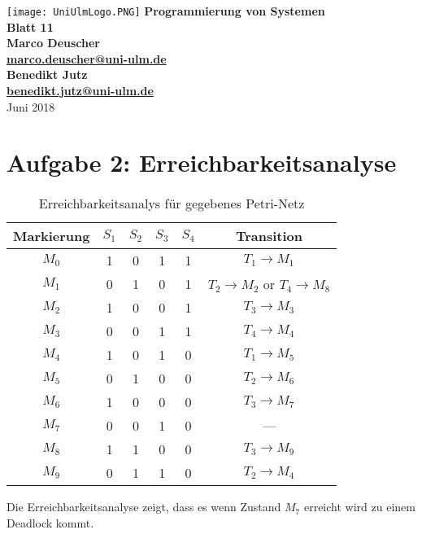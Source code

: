 \documentclass{article}
\begin{document}
\begin{titlepage}
    \centering
    \vfill
    \texttt{[image: UniUlmLogo.PNG]} %
    \vfill
    \vfill
    {\bfseries\Large
        Programmierung von Systemen\\
        Blatt 11\\
        \vskip2cm
        Marco Deuscher\\ \href{mailto:marco.deuscher@uni-ulm.de}{marco.deuscher@uni-ulm.de}\\
        Benedikt Jutz\\ \href{benedikt.jutz@uni-ulm.de}{benedikt.jutz@uni-ulm.de}\\
        \vfill
    }    
     Juni 2018
    \vfill
    \vfill
    \vfill
\end{titlepage}

\clearpage
\section{Aufgabe 2: Erreichbarkeitsanalyse}
\begin{table}[h!]
    \centering
    \vspace{3mm}
     \begin{tabular}{|c||c||c||c||c||c|}
        \hline
        Markierung & $S_1$ & $S_2$ & $S_3$ & $S_4$ & Transition \\ 
        \hline
        $M_0$ & 1 & 0 & 1 & 1 & $T_1 \rightarrow M_1$\\
        $M_1$ & 0 & 1 & 0 & 1 & $T_2 \rightarrow M_2$ or $T_4                    \rightarrow M_8$\\
        $M_2$ & 1 & 0 & 0 & 1 & $T_3 \rightarrow M_3$\\
        $M_3$ & 0 & 0 & 1 & 1 & $T_4 \rightarrow M_4$\\
        $M_4$ & 1 & 0 & 1 & 0 & $T_1 \rightarrow M_5$\\
        $M_5$ & 0 & 1 & 0 & 0 & $T_2 \rightarrow M_6$\\
        $M_6$ & 1 & 0 & 0 & 0 & $T_3 \rightarrow M_7$\\
        $M_7$ & 0 & 0 & 1 & 0 & ---\\
        $M_8$ & 1 & 1 & 0 & 0 & $T_3 \rightarrow M_9$\\
        $M_9$ & 0 & 1 & 1 & 0 & $T_2 \rightarrow M_4$\\
        \hline
        \end{tabular}
     \caption{Erreichbarkeitsanalys für gegebenes Petri-Netz}
    \label{TabelleV04}
\end{table}

Die Erreichbarkeitsanalyse zeigt, dass es wenn Zustand $M_7$ erreicht wird zu einem Deadlock kommt.
\end{document}
